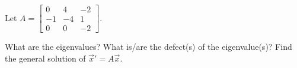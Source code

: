 \documentclass{ximera}
\begin{document}
\begin{exercise}
    Let $A = 
    \left[ 
        \begin{smallmatrix}
            0 & 4 & -2 \\
            -1 & -4 & 1 \\
            0 & 0 & -2
        \end{smallmatrix} 
    \right]$.
    \begin{tasks}
        \task What are the eigenvalues?
        \task What is/are the defect(s) of the eigenvalue(s)?
        \task Find the general solution of ${\vec{x}}' = A \vec{x}$.
    \end{tasks}
\end{exercise}
\end{document}
